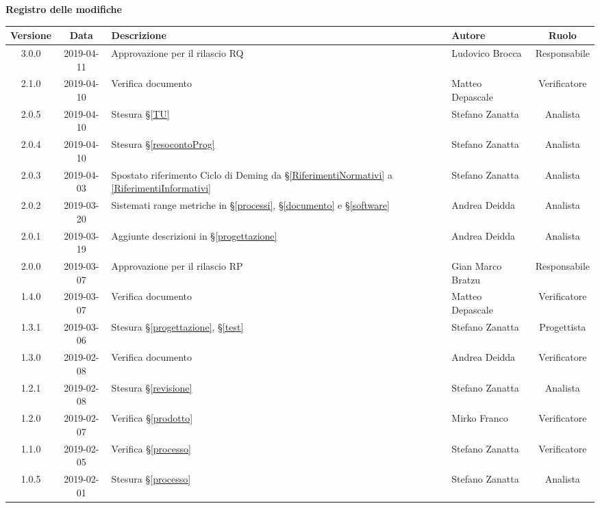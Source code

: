 	\begin{center}
		\textbf{Registro delle modifiche}
	\end{center}
	\begin{center}
		\begin{tabularx}{\textwidth}{|c|c|X|X|c|}
			\hline
			\textbf{Versione} & \textbf{Data} & \textbf{Descrizione} & \textbf{Autore} & \textbf{Ruolo} \\\hline
			\hline
			3.0.0 & 2019-04-11 &  Approvazione per il rilascio RQ & Ludovico Brocca & Responsabile \\
			\hline
			2.1.0 & 2019-04-10 &  Verifica documento & Matteo Depascale & Verificatore \\
			\hline
			2.0.5 & 2019-04-10 &  Stesura  \S\ref{TU} & Stefano Zanatta & Analista \\
			\hline
			2.0.4 & 2019-04-10 &  Stesura  \S\ref{resocontoProg} & Stefano Zanatta & Analista \\
			\hline
			2.0.3 & 2019-04-03 & Spostato riferimento Ciclo di Deming da \S\ref{RiferimentiNormativi} a \ref{RiferimentiInformativi} & Stefano Zanatta & Analista \\
			\hline
			2.0.2 & 2019-03-20 &  Sistemati range metriche in \S\ref{processi}, \S\ref{documento} e \S\ref{software} & Andrea Deidda & Analista \\
			\hline
			2.0.1 & 2019-03-19 &  Aggiunte descrizioni in \S\ref{progettazione} & Andrea Deidda & Analista \\
			\hline
			2.0.0 & 2019-03-07 &  Approvazione per il rilascio RP & Gian Marco Bratzu & Responsabile \\
			\hline
			1.4.0 & 2019-03-07 &  Verifica documento & Matteo Depascale & Verificatore \\
			\hline
			1.3.1 & 2019-03-06 &  Stesura \S\ref{progettazione}, \S\ref{test} & Stefano Zanatta & Progettista \\
			\hline
			1.3.0 & 2019-02-08 &  Verifica documento & Andrea Deidda & Verificatore \\
			\hline
			1.2.1 & 2019-02-08 &  Stesura \S\ref{revisione} & Stefano Zanatta & Analista \\
			\hline
			1.2.0 & 2019-02-07 & Verifica \S\ref{prodotto} & Mirko Franco & Verificatore \\
			\hline
			1.1.0 & 2019-02-05 & Verifica \S\ref{processo}& Stefano Zanatta & Verificatore\\
			\hline
			1.0.5 & 2019-02-01 & Stesura \S\ref{processo}& Stefano Zanatta & Analista\\

\end{tabularx}
\end{center}
